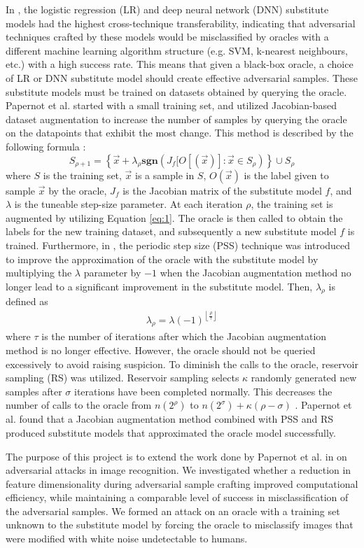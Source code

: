 In \cite{papernot3}, the logistic regression (LR) and deep neural network (DNN) substitute models had the highest cross-technique transferability, indicating that adversarial techniques crafted by these models would be misclassified by oracles with a different machine learning algorithm structure (e.g. SVM, k-nearest neighbours, etc.) with a high success rate. This means that given a black-box oracle, a choice of LR or DNN substitute model should create effective adversarial samples. These substitute models must be trained on datasets obtained by querying the oracle. Papernot et al. started with a small training set, and utilized Jacobian-based dataset augmentation to increase the number of samples by querying the oracle on the datapoints that exhibit the most change. This method is described by the following formula \cite{papernot3}:
\begin{equation} \label{eq:1}
	S_{\rho+1} = \left\{\vec{x} + \lambda_{\rho}\textbf{sgn}(J_{f}[O[(\vec{x})] : \vec{x} \in S_{\rho})\right\} \cup S_{\rho}
\end{equation}
where $S$ is the training set, $\vec{x}$ is a sample in $S$, $O(\vec{x})$ is the label given to sample $\vec{x}$ by the oracle, $J_{f}$ is the Jacobian matrix of the substitute model $f$, and $\lambda$ is the tuneable step-size parameter. At each iteration $\rho$, the training set is augmented by utilizing Equation \ref{eq:1}. The oracle is then called to obtain the labels for the new training dataset, and subsequently a new substitute model $f$ is trained. Furthermore, in \cite{papernot3}, the periodic step size (PSS) technique was introduced to improve the approximation of the oracle with the substitute model by multiplying the $\lambda$ parameter by $-1$ when the Jacobian augmentation method no longer lead to a significant improvement in the substitute model. Then, $\lambda_{\rho}$ is defined as
\begin{align}
	\lambda_{\rho} = \lambda(-1)^{\left \lfloor \frac{\rho}{\tau} \right \rfloor}    
\end{align}
where $\tau$ is the number of iterations after which the Jacobian augmentation method is no longer effective. However, the oracle should not be queried excessively to avoid raising suspicion. To diminish the calls to the oracle, reservoir sampling (RS) was utilized. Reservoir sampling selects $\kappa$ randomly generated new samples after $\sigma$ iterations have been completed normally. This decreases the number of calls to the oracle from $n(2^{\rho})$ to $n(2^{\sigma}) + \kappa (\rho-\sigma)$ \cite{papernot3}. Papernot et al. found that a Jacobian augmentation method combined with PSS and RS produced substitute models that approximated the oracle model successfully. 

The purpose of this project is to extend the work done by Papernot et al. in  on adversarial attacks in image recognition. We investigated whether a reduction in feature dimensionality during adversarial sample crafting improved computational efficiency, while maintaining a comparable level of success in misclassification of the adversarial samples. We formed an attack on an oracle with a training set unknown to the substitute model by forcing the oracle to misclassify images that were modified with white noise undetectable to humans.